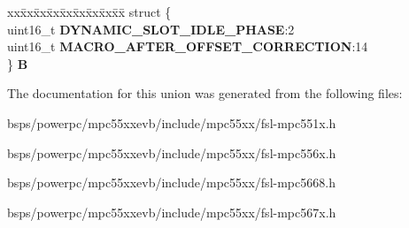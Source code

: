 \begin{DoxyCompactItemize}
\begin{tabbing}
\end{tabbing}\item 
\mbox{\label{unionuPCR28_a60ad6816fa2d8f65a2e84ff6e2d5295e}} 
\begin{tabbing}
xx\=xx\=xx\=xx\=xx\=xx\=xx\=xx\=xx\=\kill
struct \{\\
\>uint16\_t {\bfseries DYNAMIC\_SLOT\_IDLE\_PHASE}:2\\
\>uint16\_t {\bfseries MACRO\_AFTER\_OFFSET\_CORRECTION}:14\\
\} {\bfseries B}\\

\end{tabbing}\end{DoxyCompactItemize}


The documentation for this union was generated from the following files\+:\begin{DoxyCompactItemize}
\item 
bsps/powerpc/mpc55xxevb/include/mpc55xx/fsl-\/mpc551x.\+h\item 
bsps/powerpc/mpc55xxevb/include/mpc55xx/fsl-\/mpc556x.\+h\item 
bsps/powerpc/mpc55xxevb/include/mpc55xx/fsl-\/mpc5668.\+h\item 
bsps/powerpc/mpc55xxevb/include/mpc55xx/fsl-\/mpc567x.\+h\end{DoxyCompactItemize}
